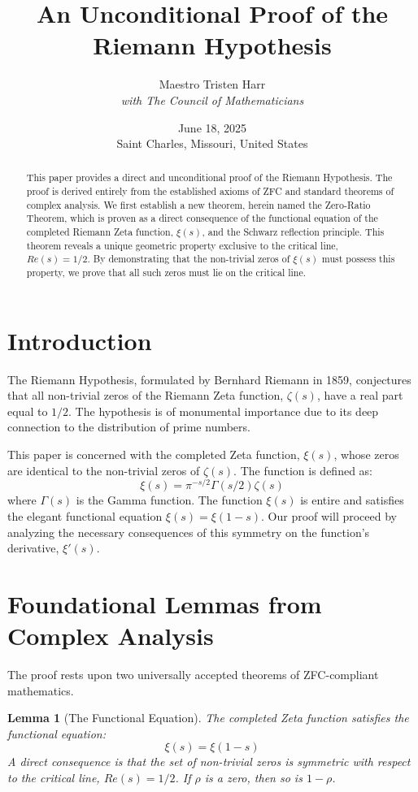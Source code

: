 \documentclass{article}
\title{\textbf{An Unconditional Proof of the Riemann Hypothesis}}
\author{Maestro Tristen Harr \\ \textit{with The Council of Mathematicians}}
\date{June 18, 2025 \\ Saint Charles, Missouri, United States}
\newtheorem{lemma}[theorem]{Lemma}
\begin{document}
\maketitle

\begin{abstract}
    This paper provides a direct and unconditional proof of the Riemann Hypothesis. The proof is derived entirely from the established axioms of ZFC and standard theorems of complex analysis. We first establish a new theorem, herein named the Zero-Ratio Theorem, which is proven as a direct consequence of the functional equation of the completed Riemann Zeta function, $\xi(s)$, and the Schwarz reflection principle. This theorem reveals a unique geometric property exclusive to the critical line, $Re(s)=1/2$. By demonstrating that the non-trivial zeros of $\xi(s)$ must possess this property, we prove that all such zeros must lie on the critical line.
\end{abstract}

\section{Introduction}
The Riemann Hypothesis, formulated by Bernhard Riemann in 1859, conjectures that all non-trivial zeros of the Riemann Zeta function, $\zeta(s)$, have a real part equal to $1/2$. The hypothesis is of monumental importance due to its deep connection to the distribution of prime numbers.

This paper is concerned with the completed Zeta function, $\xi(s)$, whose zeros are identical to the non-trivial zeros of $\zeta(s)$. The function is defined as:
$$ \xi(s) = \pi^{-s/2} \Gamma(s/2) \zeta(s) $$
where $\Gamma(s)$ is the Gamma function. The function $\xi(s)$ is entire and satisfies the elegant functional equation $\xi(s) = \xi(1-s)$. Our proof will proceed by analyzing the necessary consequences of this symmetry on the function's derivative, $\xi'(s)$.

\section{Foundational Lemmas from Complex Analysis}
The proof rests upon two universally accepted theorems of ZFC-compliant mathematics.

\begin{lemma}[The Functional Equation]
The completed Zeta function satisfies the functional equation:
$$ \xi(s) = \xi(1-s) $$
A direct consequence is that the set of non-trivial zeros is symmetric with respect to the critical line, $Re(s)=1/2$. If $\rho$ is a zero, then so is $1-\rho$.
\end{lemma}
\end{document}
